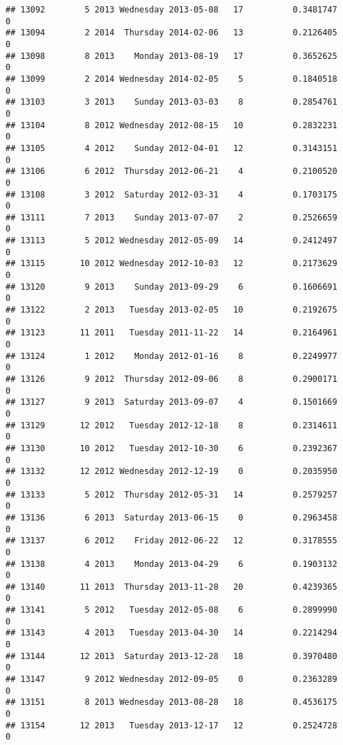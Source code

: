 \documentclass[
]{article}
\begin{document}
\begin{verbatim}
## 13092        5 2013 Wednesday 2013-05-08   17          0.3481747             0
## 13094        2 2014  Thursday 2014-02-06   13          0.2126405             0
## 13098        8 2013    Monday 2013-08-19   17          0.3652625             0
## 13099        2 2014 Wednesday 2014-02-05    5          0.1840518             0
## 13103        3 2013    Sunday 2013-03-03    8          0.2854761             0
## 13104        8 2012 Wednesday 2012-08-15   10          0.2832231             0
## 13105        4 2012    Sunday 2012-04-01   12          0.3143151             0
## 13106        6 2012  Thursday 2012-06-21    4          0.2100520             0
## 13108        3 2012  Saturday 2012-03-31    4          0.1703175             0
## 13111        7 2013    Sunday 2013-07-07    2          0.2526659             0
## 13113        5 2012 Wednesday 2012-05-09   14          0.2412497             0
## 13115       10 2012 Wednesday 2012-10-03   12          0.2173629             0
## 13120        9 2013    Sunday 2013-09-29    6          0.1606691             0
## 13122        2 2013   Tuesday 2013-02-05   10          0.2192675             0
## 13123       11 2011   Tuesday 2011-11-22   14          0.2164961             0
## 13124        1 2012    Monday 2012-01-16    8          0.2249977             0
## 13126        9 2012  Thursday 2012-09-06    8          0.2900171             0
## 13127        9 2013  Saturday 2013-09-07    4          0.1501669             0
## 13129       12 2012   Tuesday 2012-12-18    8          0.2314611             0
## 13130       10 2012   Tuesday 2012-10-30    6          0.2392367             0
## 13132       12 2012 Wednesday 2012-12-19    0          0.2035950             0
## 13133        5 2012  Thursday 2012-05-31   14          0.2579257             0
## 13136        6 2013  Saturday 2013-06-15    0          0.2963458             0
## 13137        6 2012    Friday 2012-06-22   12          0.3178555             0
## 13138        4 2013    Monday 2013-04-29    6          0.1903132             0
## 13140       11 2013  Thursday 2013-11-28   20          0.4239365             0
## 13141        5 2012   Tuesday 2012-05-08    6          0.2899990             0
## 13143        4 2013   Tuesday 2013-04-30   14          0.2214294             0
## 13144       12 2013  Saturday 2013-12-28   18          0.3970480             0
## 13147        9 2012 Wednesday 2012-09-05    0          0.2363289             0
## 13151        8 2013 Wednesday 2013-08-28   18          0.4536175             0
## 13154       12 2013   Tuesday 2013-12-17   12          0.2524728             0

\end{verbatim}
\end{document}
